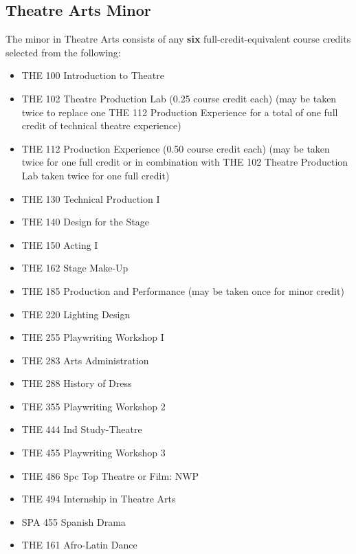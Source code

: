 \documentclass[
  letterpaper,
]{scrbook}
\providecommand{\tightlist}{%
  \setlength{\itemsep}{0pt}\setlength{\parskip}{0pt}}
\begin{document}
\subsection{Theatre Arts Minor}\label{theatre-arts-minor}

The minor in Theatre Arts consists of any \textbf{six}
full-credit-equivalent course credits selected from the following:

\begin{itemize}
\tightlist
\item
  THE 100 Introduction to Theatre\\
\item
  THE 102 Theatre Production Lab (0.25 course credit each) (may be taken
  twice to replace one THE 112 Production Experience for a total of one
  full credit of technical theatre experience)\\
\item
  THE 112 Production Experience (0.50 course credit each) (may be taken
  twice for one full credit or in combination with THE 102 Theatre
  Production Lab taken twice for one full credit)\\
\item
  THE 130 Technical Production I\\
\item
  THE 140 Design for the Stage\\
\item
  THE 150 Acting I\\
\item
  THE 162 Stage Make-Up\\
\item
  THE 185 Production and Performance (may be taken once for minor
  credit)\\
\item
  THE 220 Lighting Design\\
\item
  THE 255 Playwriting Workshop I\\
\item
  THE 283 Arts Administration\\
\item
  THE 288 History of Dress\\
\item
  THE 355 Playwriting Workshop 2\\
\item
  THE 444 Ind Study-Theatre\\
\item
  THE 455 Playwriting Workshop 3\\
\item
  THE 486 Spc Top Theatre or Film: NWP\\
\item
  THE 494 Internship in Theatre Arts\\
\item
  SPA 455 Spanish Drama\\
\item
  THE 161 Afro-Latin Dance
\end{itemize}
\end{document}
